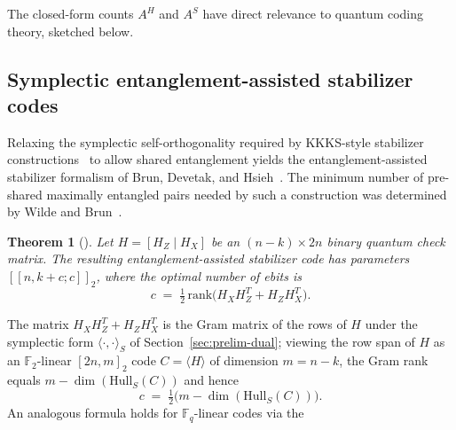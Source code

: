 \documentclass[10pt,a4paper]{amsart}
\newtheorem{theorem}{Theorem}
\newcommand{\F}{\mathbb{F}}
\begin{document}
The closed-form counts $A^H$ and $A^S$ have direct relevance to quantum
coding theory, sketched below.

\subsection{Symplectic entanglement-assisted stabilizer codes}

Relaxing the symplectic self-orthogonality required by KKKS-style
stabilizer constructions~\cite{KKKS2006} to allow shared entanglement
yields the entanglement-assisted stabilizer formalism of Brun, Devetak,
and Hsieh~\cite{BDH2006}. The minimum number of pre-shared maximally
entangled pairs needed by such a construction was determined by Wilde
and Brun~\cite[Theorem~1]{WildeBrun2008}.

\begin{theorem}[{\cite[Theorem~1]{WildeBrun2008}}]\label{thm:WB}
Let $H = [H_Z \mid H_X]$ be an $(n - k) \times 2n$ binary quantum check
matrix. The resulting entanglement-assisted stabilizer code has parameters
$[[n, k + c; c]]_2$, where the optimal number of ebits is
\[
   c \;=\; \tfrac{1}{2}\,\mathrm{rank}\bigl(H_X H_Z^T + H_Z H_X^T\bigr).
\]
\end{theorem}

The matrix $H_X H_Z^T + H_Z H_X^T$ is the Gram matrix of the rows of $H$
under the symplectic form $\langle\cdot,\cdot\rangle_S$ of
Section~\ref{sec:prelim-dual}; viewing the row span of $H$ as an
$\F_2$-linear $[2n, m]_2$ code $C = \langle H\rangle$ of dimension
$m = n - k$, the Gram rank equals $m - \dim(\mathrm{Hull}_S(C))$ and
hence
\[
   c \;=\; \tfrac{1}{2}\bigl(m - \dim(\mathrm{Hull}_S(C))\bigr).
\]
An analogous formula holds for $\F_q$-linear codes via the
\end{document}
